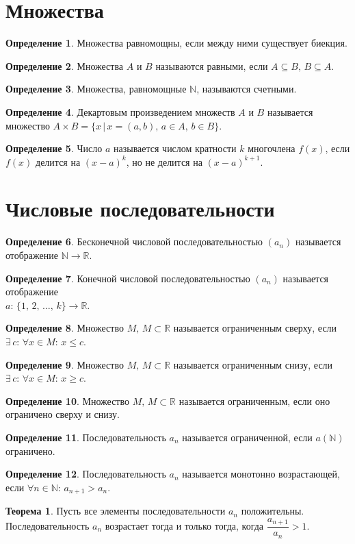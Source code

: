 \documentclass[12pt]{article}
\theoremstyle{definition}
\newtheorem{theorem}{Теорема}[section]
\newtheorem{definition}{Определение}
\newcommand{\N}{\mathbb{N}}
\newcommand{\R}{\mathbb{R}}
\begin{document}
\section{Множества}
\begin{definition}
    Множества равномощны, если между ними существует биекция.
\end{definition}
\begin{definition}
    Множества $A$ и $B$ называются равными, если $A\subseteq B,\,B\subseteq A.$
\end{definition}
\begin{definition}
    Множества, равномощные $\N$, называются счетными.
\end{definition}
\begin{definition}
    Декартовым произведением множеств $A$ и $B$ называется множество $A\times B=\{x\,|\,x=(a,b),\,a\in A,\,b\in B\}$.
\end{definition}
\begin{definition}
    Число $a$ называется числом кратности $k$ многочлена $f(x)$, если $f(x)$ делится на $(x-a)^k$, но не делится на $(x-a)^{k+1}$.
\end{definition}

\section{Числовые последовательности}
\begin{definition}
    Бесконечной числовой последовательностью $(a_n)$ называется отображение $\N \to \R$.
\end{definition}
\begin{definition}
    Конечной числовой последовательностью $(a_n)$ называется отображение\\ $a:\,\{1,\,2,\,\ldots,\,k\}\to \R$.
\end{definition}

\begin{definition}
    Множество $M,\,M\subset\R$ называется ограниченным сверху, если $\exists\, c:\,\forall x\in M:\,x \leq c$.
\end{definition}
\begin{definition}
    Множество $M,\,M\subset\R$ называется ограниченным снизу, если $\exists\, c:\,\forall x\in M:\,x \geq c$.
\end{definition}
\begin{definition}
    Множество $M,\,M\subset\R$ называется ограниченным, если оно ограничено сверху и снизу.
\end{definition}
\begin{definition}
    Последовательность $a_n$ называется ограниченной, если $a(\N)$ ограничено. 
\end{definition}
\begin{definition}
    Последовательность $a_n$ называется монотонно возрастающей, если $\forall n \in \N:\, a_{n+1}>a_n$.
\end{definition}
\begin{theorem}
    Пусть все элементы последовательности $a_n$ положительны. Последовательность $a_n$ возрастает тогда и только тогда, когда $\dfrac{a_{n+1}}{a_n}>1$.
\end{theorem}
\end{document}
